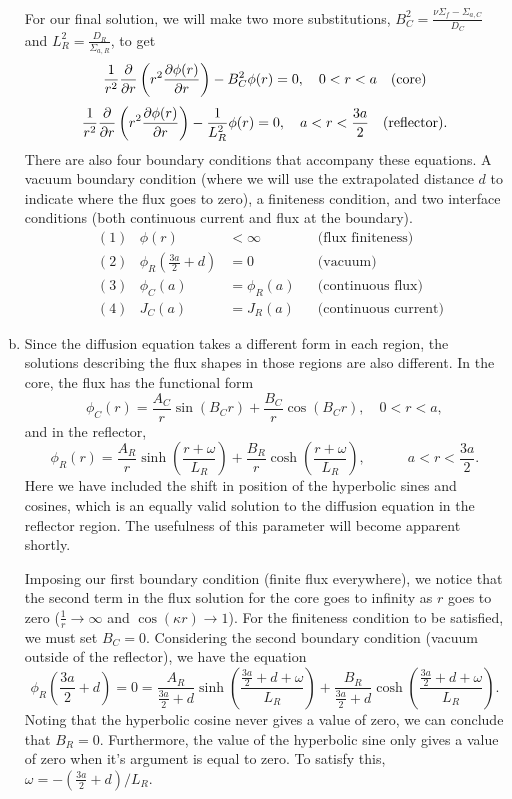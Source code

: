 \documentclass{report}
\begin{document}
\begin{enumerate}[a)]
For our final solution, we will make two more substitutions, $B_C^2 = \frac{\nu\Sigma_f - \Sigma_{a,C}}{D_C}$ and $L_R^2 = \frac{D_R}{\Sigma_{a,R}}$, to get
$$ \frac{1}{r^2}\frac{\partial}{\partial r}\left(r^2 \frac{\partial \phi(r)}{\partial r}\right) - B_C^2 \phi(r) = 0, \quad 0 < r < a \quad\text{(core)} $$
$$ \frac{1}{r^2}\frac{\partial}{\partial r}\left(r^2 \frac{\partial \phi(r)}{\partial r}\right) - \frac{1}{L_R^2}\phi(r) = 0, \quad a < r < \frac{3a}{2} \quad\text{(reflector)} .$$
There are also four boundary conditions that accompany these equations. A vacuum boundary condition (where we will use the extrapolated distance $d$ to indicate where the flux goes to zero), a finiteness condition, and two interface conditions (both continuous current and flux at the boundary). 
\begin{align*}
&(1)& \phi(r) &< \infty  						& &\text{(flux finiteness)} \\
&(2)& \phi_R\left(\frac{3a}{2} + d\right) &= 0 	& &\text{(vacuum)} \\
&(3)& \phi_C(a) &= \phi_R(a)					& &\text{(continuous flux)} \\
&(4)& J_C(a) &= J_R(a)							& &\text{(continuous current)}
\end{align*} 

\item

Since the diffusion equation takes a different form in each region, the solutions describing the flux shapes in those regions are also different. In the core, the flux has the functional form
$$ \phi_C(r) = \frac{A_C}{r} \sin\left(B_C r\right) + \frac{B_C}{r} \cos\left(B_C r\right) , \quad 0 < r < a,$$
and in the reflector,
$$ \phi_R(r) = \frac{A_R}{r}\sinh\left(\frac{r+\omega}{L_R}\right) + \frac{B_R}{r} \cosh\left(\frac{r+\omega}{L_R}\right), \quad\quad\quad a < r < \frac{3a}{2} .$$
Here we have included the shift in position of the hyperbolic sines and cosines, which is an equally valid solution to the diffusion equation in the reflector region. The usefulness of this parameter will become apparent shortly.

Imposing our first boundary condition (finite flux everywhere), we notice that the second term in the flux solution for the core goes to infinity as $r$ goes to zero ($\frac{1}{r} \rightarrow \infty$ and $\cos(\kappa r) \rightarrow 1$). For the finiteness condition to be satisfied, we must set $B_C = 0$. Considering the second boundary condition (vacuum outside of the reflector), we have the equation
$$ \phi_R\left(\frac{3a}{2}+d\right) = 0 = \frac{A_R}{\frac{3a}{2}+d}\sinh\left(\frac{\frac{3a}{2}+d+\omega}{L_R}\right) + \frac{B_R}{\frac{3a}{2}+d} \cosh\left(\frac{\frac{3a}{2}+d+\omega}{L_R}\right) .$$
Noting that the hyperbolic cosine never gives a value of zero, we can conclude that $B_R = 0$.  Furthermore, the value of the hyperbolic sine only gives a value of zero when it's argument is equal to zero. To satisfy this, $\omega = -\left(\frac{3a}{2}+d\right)/L_R$.


\end{enumerate}
\end{document}
